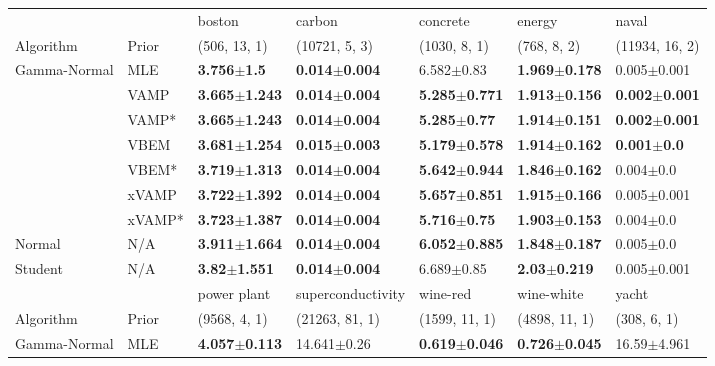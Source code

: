 \begin{tabular}{lllllll}
\toprule
        &     &                    boston &                    carbon &                  concrete &                    energy &                     naval \\
Algorithm & Prior& (506, 13, 1)& (10721, 5, 3)& (1030, 8, 1)& (768, 8, 2)& (11934, 16, 2)\\
\midrule
Gamma-Normal & MLE &    \textbf{3.756$\pm$1.5} &  \textbf{0.014$\pm$0.004} &            6.582$\pm$0.83 &  \textbf{1.969$\pm$0.178} &           0.005$\pm$0.001 \\
        & VAMP &  \textbf{3.665$\pm$1.243} &  \textbf{0.014$\pm$0.004} &  \textbf{5.285$\pm$0.771} &  \textbf{1.913$\pm$0.156} &  \textbf{0.002$\pm$0.001} \\
        & VAMP* &  \textbf{3.665$\pm$1.243} &  \textbf{0.014$\pm$0.004} &   \textbf{5.285$\pm$0.77} &  \textbf{1.914$\pm$0.151} &  \textbf{0.002$\pm$0.001} \\
        & VBEM &  \textbf{3.681$\pm$1.254} &  \textbf{0.015$\pm$0.003} &  \textbf{5.179$\pm$0.578} &  \textbf{1.914$\pm$0.162} &    \textbf{0.001$\pm$0.0} \\
        & VBEM* &  \textbf{3.719$\pm$1.313} &  \textbf{0.014$\pm$0.004} &  \textbf{5.642$\pm$0.944} &  \textbf{1.846$\pm$0.162} &             0.004$\pm$0.0 \\
        & xVAMP &  \textbf{3.722$\pm$1.392} &  \textbf{0.014$\pm$0.004} &  \textbf{5.657$\pm$0.851} &  \textbf{1.915$\pm$0.166} &           0.005$\pm$0.001 \\
        & xVAMP* &  \textbf{3.723$\pm$1.387} &  \textbf{0.014$\pm$0.004} &   \textbf{5.716$\pm$0.75} &  \textbf{1.903$\pm$0.153} &             0.004$\pm$0.0 \\
Normal & N/A &  \textbf{3.911$\pm$1.664} &  \textbf{0.014$\pm$0.004} &  \textbf{6.052$\pm$0.885} &  \textbf{1.848$\pm$0.187} &             0.005$\pm$0.0 \\
Student & N/A &   \textbf{3.82$\pm$1.551} &  \textbf{0.014$\pm$0.004} &            6.689$\pm$0.85 &   \textbf{2.03$\pm$0.219} &           0.005$\pm$0.001 \\
\midrule
        &     &               power plant &          superconductivity &                  wine-red &                wine-white &                     yacht \\
Algorithm & Prior& (9568, 4, 1)& (21263, 81, 1)& (1599, 11, 1)& (4898, 11, 1)& (308, 6, 1)\\
\midrule
Gamma-Normal & MLE &  \textbf{4.057$\pm$0.113} &            14.641$\pm$0.26 &  \textbf{0.619$\pm$0.046} &  \textbf{0.726$\pm$0.045} &           16.59$\pm$4.961 \\

\end{tabular}
